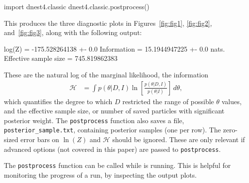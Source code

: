 \documentclass[article]{jss}
\begin{document}
\begin{CodeChunk}
\begin{CodeInput}
import dnest4.classic
dnest4.classic.postprocess()
\end{CodeInput}
\end{CodeChunk}
This produces the three diagnostic plots in Figures~\ref{fig:fig1},
\ref{fig:fig2}, and~\ref{fig:fig3}, along with the following output:
\begin{CodeChunk}
\begin{CodeOutput}
log(Z) = -175.528264138 +- 0.0
Information = 15.1944947225 +- 0.0 nats.
Effective sample size = 745.819862383
\end{CodeOutput}
\end{CodeChunk}
These are the natural log of the marginal likelihood, the
information
\begin{align}
\mathcal{H} &= \int p(\theta|D, I)
\ln\left[\frac{p(\theta | D, I)}{p(\theta | I)}\right] \, d\theta,
\end{align}
which quantifies the degree to which $D$ restricted the
range of possible $\theta$ values,
and the effective sample size,
or number of saved particles with significant posterior weight.
The {\tt postprocess} function also saves a file,
{\tt posterior\_sample.txt}, containing posterior samples (one per row).
The zero-sized error bars on $\ln(Z)$ and $\mathcal{H}$ should be ignored.
These are only relevant if advanced options (not covered in this paper)
are passed to {\tt postprocess}.

The {\tt postprocess} function can be called while  is running.
This is helpful for monitoring the progress of a run, by inspecting the
output plots.
\end{document}
